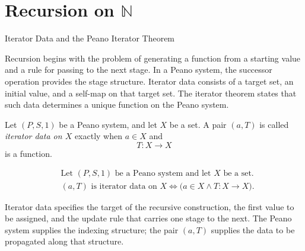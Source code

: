 \section{Recursion on \texorpdfstring{$\mathbb{N}$}{N}}

\begin{topicbox}{Iterator Data and the Peano Iterator Theorem}
\begin{exposition}
Recursion begins with the problem of generating a function from a starting
value and a rule for passing to the next stage. In a Peano system, the
successor operation provides the stage structure. Iterator data consists of a
target set, an initial value, and a self-map on that target set. The iterator
theorem states that such data determines a unique function on the Peano
system.
\end{exposition}

\begin{tcolorbox}[colback=defbox, colframe=defborder, arc=2pt,
  left=6pt, right=6pt, top=4pt, bottom=4pt,
  title={\small\textbf{Definition (Iterator Data on a Peano System)}},
  fonttitle=\small\bfseries]
\begin{definition}
\label{def:iterator-data-on-peano-system}
Let $(P,S,1)$ be a Peano system, and let $X$ be a set. A pair $(a,T)$ is
called \emph{iterator data on $X$} exactly when $a \in X$ and
\[
T : X \to X
\]
is a function.
\end{definition}
\end{tcolorbox}

\begin{remark*}
\[
\begin{aligned}
&\text{Let } (P,S,1) \text{ be a Peano system and let } X \text{ be a set.}\\
&(a,T) \text{ is iterator data on } X
\Longleftrightarrow
\bigl(a \in X \land T : X \to X\bigr).
\end{aligned}
\]
\end{remark*}

\begin{remark*}[Interpretation]
Iterator data specifies the target of the recursive construction, the first
value to be assigned, and the update rule that carries one stage to the next.
The Peano system supplies the indexing structure; the pair $(a,T)$ supplies the
data to be propagated along that structure.
\end{remark*}

\NoLocalDependencies


\end{topicbox}
